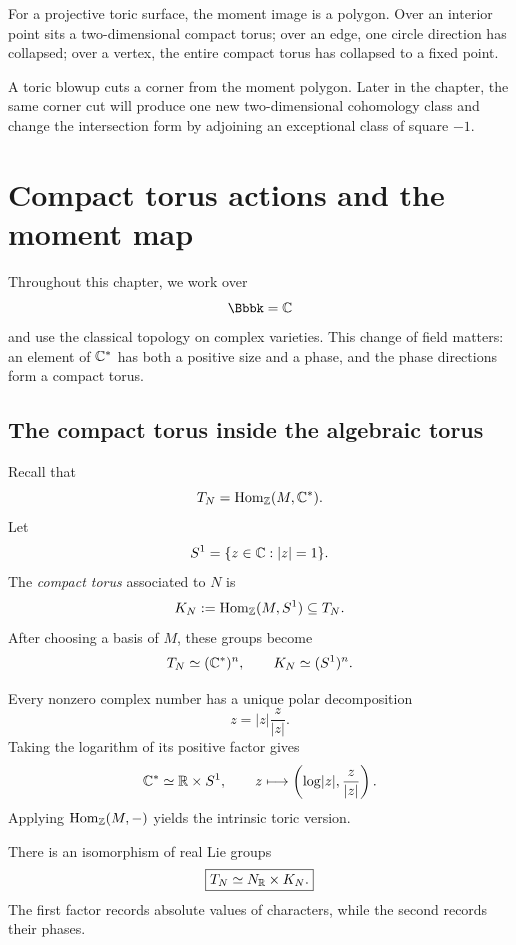 \begin{surfacelaboratory}
For a projective toric surface, the moment image is a polygon. Over an
interior point sits a two-dimensional compact torus; over an edge, one
circle direction has collapsed; over a vertex, the entire compact torus
has collapsed to a fixed point.

A toric blowup cuts a corner from the moment polygon. Later in the
chapter, the same corner cut will produce one new two-dimensional
cohomology class and change the intersection form by adjoining an
exceptional class of square \(-1\).
\end{surfacelaboratory}

\section{Compact torus actions and the moment map}
\label{sec:compact-torus-moment-map}

Throughout this chapter, we work over
\[
\Bbbk=\CC
\]
and use the classical topology on complex varieties. This change of
field matters: an element of \(\mathbb{C}^*\) has both a positive size and a
phase, and the phase directions form a compact torus.

\subsection{The compact torus inside the algebraic torus}

Recall that
\[
T_N=\operatorname{Hom}_{\mathbb{Z}}(M,\mathbb{C}^*).
\]
Let
\[
S^1=\{z\in\mathbb{C}:\lvert z\rvert=1\}.
\]
The \emph{compact torus} associated to \(N\) is
\[
K_N:=\operatorname{Hom}_{\mathbb{Z}}(M,S^1)\subseteq T_N.
\]
After choosing a basis of \(M\), these groups become
\[
T_N\simeq(\mathbb{C}^*)^n,
\qquad
K_N\simeq(S^1)^n.
\]

Every nonzero complex number has a unique polar decomposition
\[
z=\lvert z\rvert\frac{z}{\lvert z\rvert}.
\]
Taking the logarithm of its positive factor gives
\[
\mathbb{C}^*\simeq\mathbb{R}\times S^1,
\qquad
z\longmapsto
\left(\log\lvert z\rvert,\frac{z}{\lvert z\rvert}\right).
\]
Applying \(\operatorname{Hom}_{\mathbb{Z}}(M,-)\) yields the intrinsic toric version.

\begin{proposition}
\label{prop:radial-angular-directions}
There is an isomorphism of real Lie groups
\[
\boxed{T_N\simeq N_{\mathbb{R}}\times K_N.}
\]
The first factor records absolute values of characters, while the second
records their phases.
\end{proposition}

